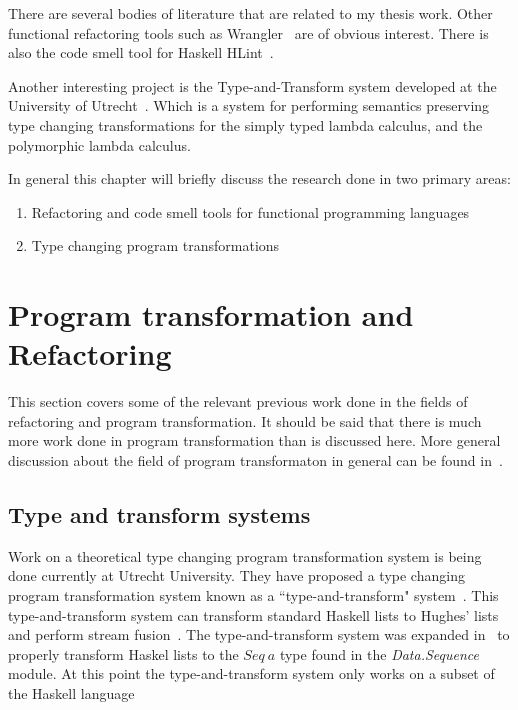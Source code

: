 There are several bodies of literature that are related to my thesis work. Other functional refactoring tools such as Wrangler~\citep{wrangler} are of obvious interest. There is also the code smell tool for Haskell HLint~\citep{hlint}.

Another interesting project is the Type-and-Transform system developed at the University of Utrecht~\citep{typeAndTransform}. Which is a system for performing semantics preserving type changing transformations for the simply typed lambda calculus, and the polymorphic lambda calculus.

In general this chapter will briefly discuss the research done in two primary areas:

\begin{enumerate}
\item Refactoring and code smell tools for functional programming languages
\item Type changing program transformations 
\end{enumerate}

\section{Program transformation and Refactoring}

This section covers some of the relevant previous work done in the fields of refactoring and program transformation. It should be said that there is much more work done in program transformation than is discussed here. More general discussion about the field of program transformaton in general can be found in~\citep{visserSurvey,transformationIntro}.

\subsection{Type and transform systems}

Work on a theoretical type changing program transformation system is being done currently at Utrecht University. They have proposed a type changing program transformation system known as a ``type-and-transform" system~\citep{typeAndTransform}. This type-and-transform system can transform standard Haskell lists to Hughes' lists and perform stream fusion~\citep{typeAndTransform}. The type-and-transform system was expanded in~\citep{typeAndTransformPatterns} to properly transform Haskel lists to the $Seq~a$ type found in the \textit{Data.Sequence} module. At this point the type-and-transform system only works on a subset of the Haskell language~\citep{typeAndTransform}

